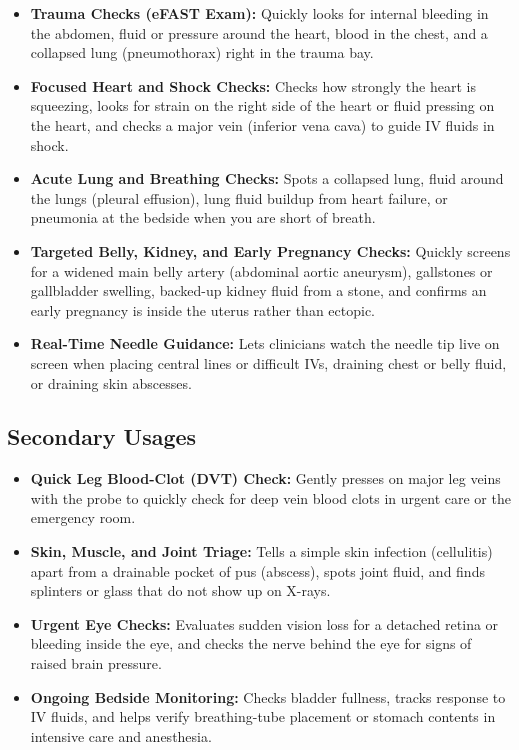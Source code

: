 \begin{itemize}
    \item \textbf{Trauma Checks (eFAST Exam):} Quickly looks for internal bleeding in the abdomen, fluid or pressure around the heart, blood in the chest, and a collapsed lung (pneumothorax) right in the trauma bay.
    \item \textbf{Focused Heart and Shock Checks:} Checks how strongly the heart is squeezing, looks for strain on the right side of the heart or fluid pressing on the heart, and checks a major vein (inferior vena cava) to guide IV fluids in shock.
    \item \textbf{Acute Lung and Breathing Checks:} Spots a collapsed lung, fluid around the lungs (pleural effusion), lung fluid buildup from heart failure, or pneumonia at the bedside when you are short of breath.
    \item \textbf{Targeted Belly, Kidney, and Early Pregnancy Checks:} Quickly screens for a widened main belly artery (abdominal aortic aneurysm), gallstones or gallbladder swelling, backed-up kidney fluid from a stone, and confirms an early pregnancy is inside the uterus rather than ectopic.
    \item \textbf{Real-Time Needle Guidance:} Lets clinicians watch the needle tip live on screen when placing central lines or difficult IVs, draining chest or belly fluid, or draining skin abscesses.
\end{itemize}

\subsection{Secondary Usages}

\begin{itemize}
    \item \textbf{Quick Leg Blood-Clot (DVT) Check:} Gently presses on major leg veins with the probe to quickly check for deep vein blood clots in urgent care or the emergency room.
    \item \textbf{Skin, Muscle, and Joint Triage:} Tells a simple skin infection (cellulitis) apart from a drainable pocket of pus (abscess), spots joint fluid, and finds splinters or glass that do not show up on X-rays.
    \item \textbf{Urgent Eye Checks:} Evaluates sudden vision loss for a detached retina or bleeding inside the eye, and checks the nerve behind the eye for signs of raised brain pressure.
    \item \textbf{Ongoing Bedside Monitoring:} Checks bladder fullness, tracks response to IV fluids, and helps verify breathing-tube placement or stomach contents in intensive care and anesthesia.
\end{itemize}


